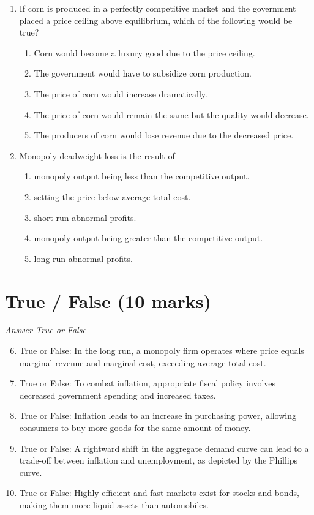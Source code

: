 \documentclass[12pt]{article}
\begin{document}
\begin{enumerate}[label=\arabic*.]
\begin{enumerate}[label=(\alph*)]
\end{enumerate}
\item If corn is produced in a perfectly competitive market and the government placed a price ceiling above equilibrium, which of the following would be true?
\begin{enumerate}[label=(\alph*)]
    \item Corn would become a luxury good due to the price ceiling.
    \item The government would have to subsidize corn production.
    \item The price of corn would increase dramatically.
    \item The price of corn would remain the same but the quality would decrease.
    \item The producers of corn would lose revenue due to the decreased price.
\end{enumerate}
\item Monopoly deadweight loss is the result of
\begin{enumerate}[label=(\alph*)]
    \item monopoly output being less than the competitive output.
    \item setting the price below average total cost.
    \item short-run abnormal profits.
    \item monopoly output being greater than the competitive output.
    \item long-run abnormal profits.
\end{enumerate}
\end{enumerate}

\section*{True / False (10 marks)}
\textit{Answer True or False}
\begin{enumerate}[label=\arabic*.]
\setcounter{enumi}{5}
\item True or False: In the long run, a monopoly firm operates where price equals marginal revenue and marginal cost, exceeding average total cost.
\item True or False: To combat inflation, appropriate fiscal policy involves decreased government spending and increased taxes.
\item True or False: Inflation leads to an increase in purchasing power, allowing consumers to buy more goods for the same amount of money.
\item True or False: A rightward shift in the aggregate demand curve can lead to a trade-off between inflation and unemployment, as depicted by the Phillips curve.
\item True or False: Highly efficient and fast markets exist for stocks and bonds, making them more liquid assets than automobiles.
\end{enumerate}
\end{document}

